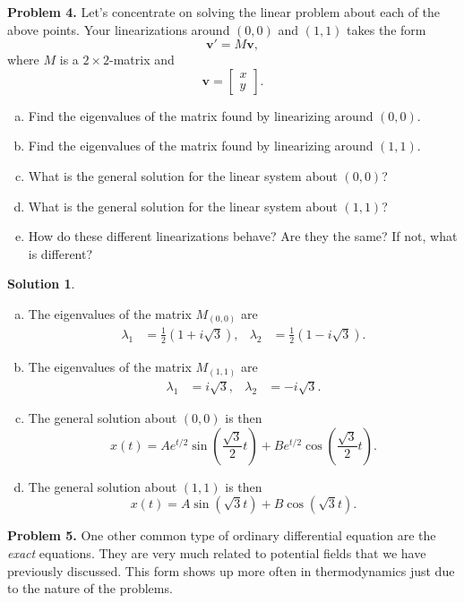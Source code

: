 \documentclass[12pt]{report} %
\theoremstyle{definition}
\newtheorem{solution}{Solution}
\begin{document}
\noindent\textbf{Problem 4.} Let's concentrate on solving the linear problem about each of the above points. Your linearizations around $(0,0)$ and $(1,1)$ takes the form
    \[
    \mathbf{v}'=M\mathbf{v},
    \]
    where $M$ is a $2\times2$-matrix and 
    \[
    \mathbf{v}= \begin{bmatrix} x \\ y \end{bmatrix}.
    \]
\begin{enumerate}[(a)]
    \item Find the eigenvalues of the matrix found by linearizing around $(0,0)$.
    \item Find the eigenvalues of the matrix found by linearizing around $(1,1)$.
    \item What is the general solution for the linear system about $(0,0)$?
    \item What is the general solution for the linear system about $(1,1)$?
    \item How do these different linearizations behave? Are they the same? If not, what is different?
\end{enumerate}
\begin{solution}~
\begin{enumerate}[(a)]
    \item The eigenvalues of the matrix $M_{(0,0)}$ are
    \begin{align*}
    \lambda_1 &= \frac{1}{2}(1+i\sqrt{3}), & \lambda_2&= \frac{1}{2}(1-i\sqrt{3}).
    \end{align*}
    \item The eigenvalues of the matrix $M_{(1,1)}$ are
    \begin{align*}
    \lambda_1 &= i\sqrt{3}, & \lambda_2&= -i\sqrt{3}.
    \end{align*}
    \item The general solution about $(0,0)$ is then
    \[
    x(t)=Ae^{t/2} \sin\left( \frac{\sqrt{3}}{2}t\right) + Be^{t/2}\cos \left(\frac{\sqrt{3}}{2}t \right).
    \]
    \item The general solution about $(1,1)$ is then
    \[
    x(t)= A \sin(\sqrt{3}t) + B \cos (\sqrt{3}t).
    \]
\end{enumerate}
\end{solution}
\vspace*{.5cm}

\noindent\textbf{Problem 5.} One other common type of ordinary differential equation are the \emph{exact} equations.  They are very much related to potential fields that we have previously discussed. This form shows up more often in thermodynamics just due to the nature of the problems.
\end{document}
